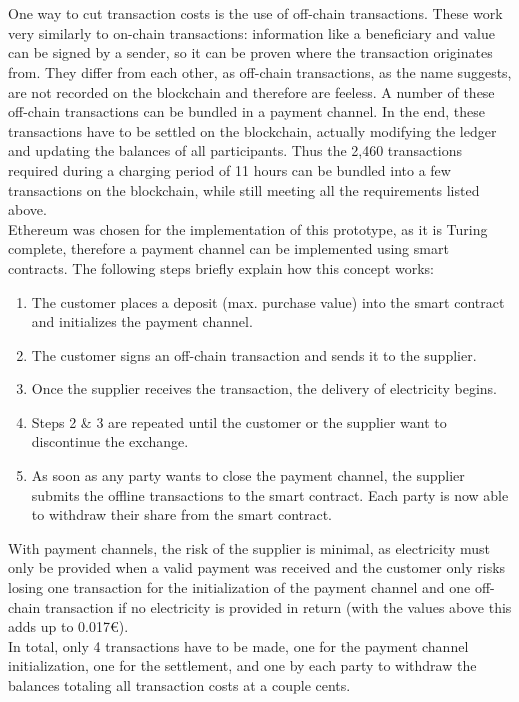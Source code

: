 \\\\
One way to cut transaction costs is the use of off-chain transactions. These work very similarly to on-chain transactions: information like a beneficiary and value can be signed by a sender, so it can be proven where the transaction originates from. They differ from each other, as off-chain transactions, as the name suggests, are not recorded on the blockchain and therefore are feeless. A number of these off-chain transactions can be bundled in a payment channel. In the end, these transactions have to be settled on the blockchain, actually modifying the ledger and updating the balances of all participants. Thus the 2,460 transactions required during a charging period of 11 hours can be bundled into a few transactions on the blockchain, while still meeting all the requirements listed above.
\\
Ethereum was chosen for the implementation of this prototype, as it is Turing complete, therefore a payment channel can be implemented using smart contracts. The following steps briefly explain how this concept works:

\begin{enumerate}
    \item The customer places a deposit (max. purchase value) into the smart contract and initializes the payment channel.
    \item The customer signs an off-chain transaction and sends it to the supplier.
    \item Once the supplier receives the transaction, the delivery of electricity begins.
    \item Steps 2 \& 3 are repeated until the customer or the supplier want to discontinue the exchange.
    \item As soon as any party wants to close the payment channel, the supplier submits the offline transactions to the smart contract. Each party is now able to withdraw their share from the smart contract.
\end{enumerate}
With payment channels, the risk of the supplier is minimal, as electricity must only be provided when a valid payment was received and the customer only risks losing one transaction for the initialization of the payment channel and one off-chain transaction if no electricity is provided in return (with the values above this adds up to 0.017\euro).
\\
In total, only 4 transactions have to be made, one for the payment channel initialization, one for the settlement, and one by each party to withdraw the balances totaling all transaction costs at a couple cents.